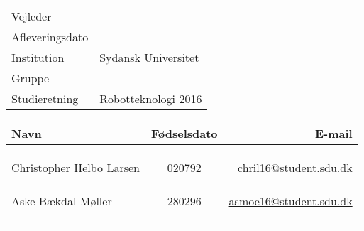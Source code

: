 \documentclass[../main.tex]{subfiles}
\begin{document}
\phantom{g}
\vspace{0.5cm}
\noindent
\begin{center}
\begin{Huge}
\textbf{\titel}
\end{Huge}
\\
\begin{huge}
\subtitel
\end{huge}
\\
\vspace{1cm}



\vspace{1.5cm}

\begin{tabular}{@{} l l @{}}
\hline
Vejleder         		&	\vejleder          	\\
Afleveringsdato 			& 	\dato				\\
Institution             	&   Sydansk Universitet	\\
Gruppe                  	&	\gruppe				\\
Studieretning           	& 	Robotteknologi 2016	\\
\hline
\end{tabular}
\thispagestyle{empty}

\vspace{1.5cm}

\begin{tabular}{ l  c  r }

Navn						& Fødselsdato &	E-mail \\ 
\hline

\multicolumn{3}{c}{}\\
\multicolumn{3}{c}{}\\
\multicolumn{3}{c}{}\\

\hline
Christopher Helbo Larsen & 020792 & 	\href{mailto:chril16@student.sdu.dk}{chril16@student.sdu.dk}\\
\multicolumn{3}{c}{}\\
\multicolumn{3}{c}{}\\
\multicolumn{3}{c}{}\\

\hline
Aske Bækdal Møller 		& 280296 &	\href{mailto:asmoe16@student.sdu.dk}{asmoe16@student.sdu.dk}\\
\multicolumn{3}{c}{}\\
\multicolumn{3}{c}{}\\
\multicolumn{3}{c}{}\\


\end{tabular}
\end{center}
\end{document}
